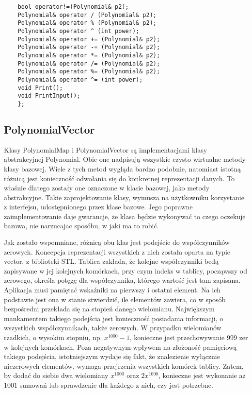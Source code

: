 \documentclass[oneside,a4paper]{book}
\begin{document}
\begin{lstlisting}
	bool operator!=(Polynomial& p2);
	Polynomial& operator / (Polynomial& p2);
	Polynomial& operator % (Polynomial& p2);
	Polynomial& operator ^ (int power);
	Polynomial& operator += (Polynomial& p2);
	Polynomial& operator -= (Polynomial& p2);
	Polynomial& operator *= (Polynomial& p2);
	Polynomial& operator /= (Polynomial& p2);
	Polynomial& operator %= (Polynomial& p2);
	Polynomial& operator ^= (int power);
	void Print();
	void PrintInput();
	};
	\end{lstlisting}
	
	\subsection{PolynomialVector}
	
	Klasy PolynomialMap i PolynomialVector są implementacjami klasy abstrakcyjnej Polynomial. Obie one nadpisują wszystkie czysto wirtualne metody klasy bazowej. Wiele z tych metod wygląda bardzo podobnie, natomiast istotną różnicą jest konieczność odwołania się do konkretnej reprezentacji danych. To właśnie dlatego zostały one oznaczone w klasie bazowej, jako metody abstrakcyjne. Takie zaprojektowanie klasy, wymusza na użytkowniku korzystanie z interfejsu, udostępnionego przez klase bazowe. Jego poprawne zaimplementowanie daje gwarancje, że klasa będzie wykonywać to czego oczekuje bazowa, nie narzucajac sposóbu, w jaki ma to robić.
	
	Jak zostało wspomniane, różnicą obu klas jest podejście do współczynników zerowych. Koncepcja reprezentacji wszystkich z nich została oparta na typie vector, z biblioteki STL. Tablica zakłada, że kolejne współczynniki bedą zapisywane w jej kolejnych komórkach, przy czym indeks w tablicy, począwszy od zerowego, określa potęgę dla współczynnika, którego wartość jest tam zapisana. Aplikacja musi pamiętać wskaźniki na pierwszy i ostatni element. Na ich podstawie jest ona w stanie stwierdzić, ile elementów zawiera, co w sposób bezpośredni przekłada się na stopień danego wielomianu. Największym mankamentem takiego podejścia jest konieczność posiadania informacji, o wszystkich współczynnikach, także zerowych. W przypadku wielomianów rzadkich, o wysokim stopniu, np. $x^{1000}-1$, konieczne jest przechowywanie 999 zer w kolejnych komórkach. Poza negatywnym wpływem na złożoność pamięciową takiego podejścia, istotniejszym wydaje się fakt, że znalezienie wyłącznie niezerowych elementów, wymaga przejrzenia wszystkich komórek tablicy. Zatem, by dodać do siebie dwa wielomiany $x^{1000}$ oraz $2x^{1000}$, konieczne jest wykonanie aż $1001$ sumowań lub sprawdzenie dla każdego z nich, czy jest potrzebne.
	
\end{document}
